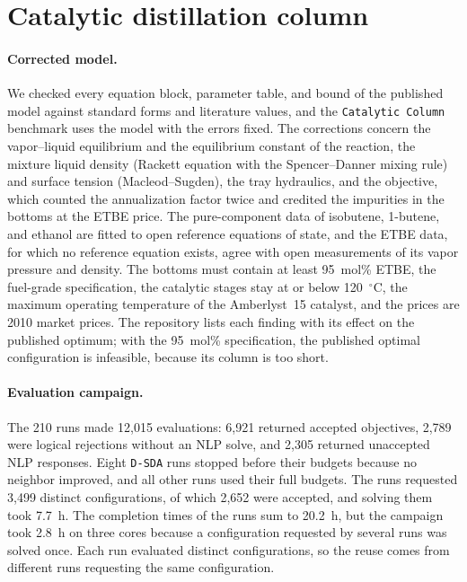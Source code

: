 \section{Catalytic distillation column}\label{sec:supp-catdist}

\paragraph{Corrected model.}
We checked every equation block, parameter table, and bound of the published model against standard forms and literature values, and the \texttt{Catalytic Column} benchmark uses the model with the errors fixed.
The corrections concern the vapor--liquid equilibrium and the equilibrium constant of the reaction, the mixture liquid density (Rackett equation with the Spencer--Danner mixing rule) and surface tension (Macleod--Sugden), the tray hydraulics, and the objective, which counted the annualization factor twice and credited the impurities in the bottoms at the ETBE price.
The pure-component data of isobutene, 1-butene, and ethanol are fitted to open reference equations of state, and the ETBE data, for which no reference equation exists, agree with open measurements of its vapor pressure and density.
The bottoms must contain at least 95~mol\% ETBE, the fuel-grade specification, the catalytic stages stay at or below 120~\(^\circ\)C, the maximum operating temperature of the Amberlyst~15 catalyst, and the prices are 2010 market prices.
The repository lists each finding with its effect on the published optimum; with the 95~mol\% specification, the published optimal configuration is infeasible, because its column is too short.

\paragraph{Evaluation campaign.}
The 210 runs made 12,015 evaluations: 6,921 returned accepted objectives, 2,789 were logical rejections without an NLP solve, and 2,305 returned unaccepted NLP responses.
Eight \texttt{D-SDA} runs stopped before their budgets because no neighbor improved, and all other runs used their full budgets.
The runs requested 3,499 distinct configurations, of which 2,652 were accepted, and solving them took 7.7~h.
The completion times of the runs sum to 20.2~h, but the campaign took 2.8~h on three cores because a configuration requested by several runs was solved once.
Each run evaluated distinct configurations, so the reuse comes from different runs requesting the same configuration.

